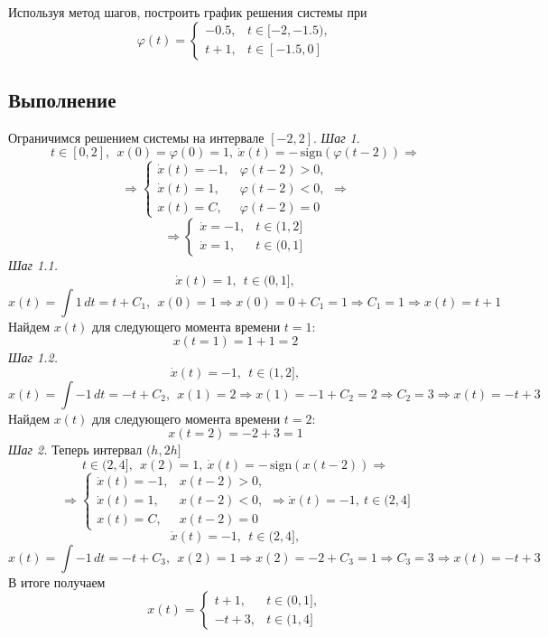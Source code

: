 \documentclass[a4paper, 12pt]{article}
\begin{document}
    Используя метод шагов, построить график решения системы при
    $$\varphi(t)=
    \begin{cases}
        -0.5, & t\in[-2,-1.5),\\
        t+1, & t\in[-1.5,0]
    \end{cases}
    $$


    \subsection{Выполнение}
    Ограничимся решением системы на интервале $[-2,2]$. \textit{Шаг 1}.
    $$
    t\in[0,2],\ \ x(0)=\varphi(0)=1,\ \dot{x}(t)=-\,\text{sign}(\varphi(t-2))\Rightarrow
    $$
    $$
    \Rightarrow\begin{cases}
        \dot{x}(t)=-1, & \varphi(t-2)>0,\\
        \dot{x}(t)=1, & \varphi(t-2)<0,\\
        x(t)=C, & \varphi(t-2)=0
    \end{cases}\Rightarrow
    $$
    $$
    \Rightarrow
    \begin{cases}
        \dot{x}=-1, & t\in(1,2]\\
        \dot{x}=1, & t\in(0,1]
    \end{cases}
    $$
    \textit{Шаг 1.1.}
    $$
    \dot{x}(t)=1,\ \ t\in(0,1],
    $$
    $$
    x(t)=\int1\,dt=t+C_1,\ \ x(0)=1\Rightarrow x(0)=0+C_1=1\Rightarrow C_1=1\Rightarrow x(t)=t+1
    $$
    Найдем $x(t)$ для следующего момента времени $t=1$:
    $$
    x(t=1)=1+1=2
    $$
    \textit{Шаг 1.2.}
    $$
    \dot{x}(t)=-1,\ \ t\in(1,2],
    $$
    $$
    x(t)=\int-1\,dt=-t+C_2,\ \ x(1)=2\Rightarrow x(1)=-1+C_2=2\Rightarrow C_2=3\Rightarrow x(t)=-t+3
    $$
    Найдем $x(t)$ для следующего момента времени $t=2$:
    $$
    x(t=2)=-2+3=1
    $$
    \textit{Шаг 2.}
    Теперь интервал $(h,2h]$
    $$
    t\in(2,4],\ \ x(2)=1,\ \dot{x}(t)=-\,\text{sign}(x(t-2))\Rightarrow
    $$
    $$
    \Rightarrow\begin{cases}
        \dot{x}(t)=-1, & x(t-2)>0,\\
        \dot{x}(t)=1, & x(t-2)<0,\\
        x(t)=C, & x(t-2)=0
    \end{cases}\Rightarrow
    \dot{x}(t)=-1,\ t\in(2,4]
    $$
    $$
    \dot{x}(t)=-1,\ \ t\in(2,4],
    $$
    $$
    x(t)=\int-1\,dt=-t+C_3,\ \ x(2)=1\Rightarrow x(2)=-2+C_3=1\Rightarrow C_3=3\Rightarrow x(t)=-t+3
    $$
    В итоге получаем
    $$
    x(t)=
    \begin{cases}
        t+1, & t\in(0,1],\\
        -t+3, & t\in(1,4]
    \end{cases}
    $$
\end{document}
